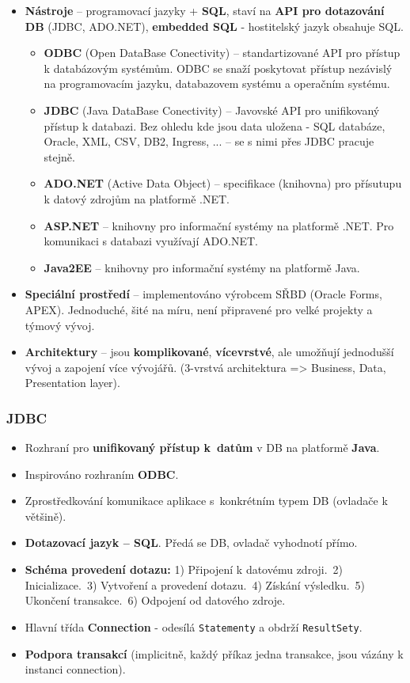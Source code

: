 \begin{itemize}
\item \textbf{Nástroje} -- programovací jazyky + \textbf{SQL}, staví na \textbf{API pro dotazování DB} (JDBC, ADO.NET), \textbf{embedded SQL} - hostitelský jazyk obsahuje SQL.
\begin{itemize}
	\item \textbf{ODBC} (Open DataBase Conectivity) -- standartizované API pro přístup k databázovým systémům. ODBC se snaží poskytovat přístup nezávislý na programovacím jazyku, databazovem systému a operačním systému. 
	\item \textbf{JDBC} (Java DataBase Conectivity) -- Javovské API pro unifikovaný přístup k databazi. Bez ohledu kde jsou data uložena - SQL databáze, Oracle, XML, CSV, DB2, Ingress, ... -- se s nimi přes JDBC pracuje stejně.
	\item \textbf{ADO.NET} (Active Data Object) -- specifikace (knihovna) pro přísutupu k datový zdrojům na platformě .NET.
	\item \textbf{ASP.NET} -- knihovny pro informační systémy na platformě .NET. Pro komunikaci s databazi využívají ADO.NET.
	\item \textbf{Java2EE} -- knihovny pro informační systémy na platformě Java.
\end{itemize}
\item\textbf{Speciální prostředí} -- implementováno výrobcem SŘBD (Oracle Forms, APEX). Jednoduché, šité na míru, není připravené pro velké projekty a týmový vývoj.
\item \textbf{Architektury} -- jsou \textbf{komplikované}, \textbf{vícevrstvé}, ale umožňují jednodušší vývoj a zapojení více vývojářů. (3-vrstvá architektura => Business, Data, Presentation layer).
\end{itemize}

\subsubsection{JDBC}
\begin{itemize}
\item Rozhraní pro \textbf{unifikovaný přístup k datům} v DB na platformě \textbf{Java}.
\item Inspirováno rozhraním \textbf{ODBC}.
\item Zprostředkování komunikace aplikace s konkrétním typem DB (ovladače k většině).
\item \textbf{Dotazovací jazyk – SQL}. Předá se DB, ovladač vyhodnotí přímo.
\item \textbf{Schéma provedení dotazu:} 1) Připojení k datovému zdroji. 2) Inicializace. 3) Vytvoření a provedení dotazu. 4) Získání výsledku. 5) Ukončení transakce. 6) Odpojení od datového zdroje.
\item Hlavní třída \textbf{Connection} - odesílá \texttt{Statementy} a obdrží \texttt{ResultSety}.
\item \textbf{Podpora transakcí }(implicitně, každý příkaz jedna transakce, jsou vázány k instanci connection). 
\end{itemize}


